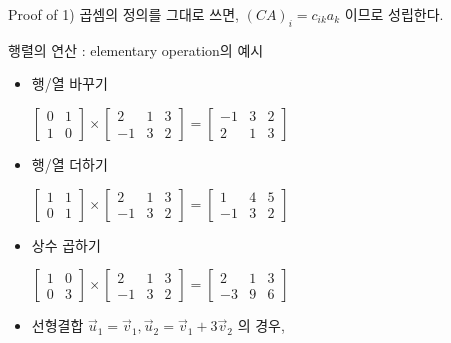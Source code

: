 \documentclass{beamer}
\begin{document}
\begin{frame}{ Proof of 1)} 
곱셈의 정의를 그대로 쓰면, 
$(CA)_{i} =  c_{ik} a_{k} $
이므로 성립한다. 
\end{frame}

\begin{frame}{행렬의 연산 : elementary operation의 예시} 


\begin{itemize} 
\item 행/열 바꾸기 


$ \left[ \begin{matrix}
0 & 1  \\
1 & 0 
\end{matrix} \right] \times
\left[ \begin{matrix}
2 & 1 & 3   \\
-1 & 3 & 2 
\end{matrix} \right] = 
\left[ \begin{matrix}
-1 & 3 & 2   \\
2 & 1 & 3 
\end{matrix} \right] $

\item 행/열 더하기

$ \left[ \begin{matrix}
1 & 1  \\
0 & 1 
\end{matrix} \right] \times
\left[ \begin{matrix}
2 & 1 & 3   \\
-1 & 3 & 2 
\end{matrix} \right] = 
\left[ \begin{matrix}
1 & 4 & 5   \\
-1 & 3 & 2 
\end{matrix} \right] $

\item 상수 곱하기

$ \left[ \begin{matrix}
1 & 0  \\
0 & 3 
\end{matrix} \right] \times
\left[ \begin{matrix}
2 & 1 & 3   \\
-1 & 3 & 2 
\end{matrix} \right] = 
\left[ \begin{matrix}
2 & 1 & 3   \\
-3 & 9 & 6 
\end{matrix} \right] $

\item 선형결합 $\vec{u}_1 = \vec{v}_1, \vec{u}_2 = \vec{v}_1 + 3\vec{v}_2$ 의 경우,


\end{itemize}
\end{frame}
\end{document}
